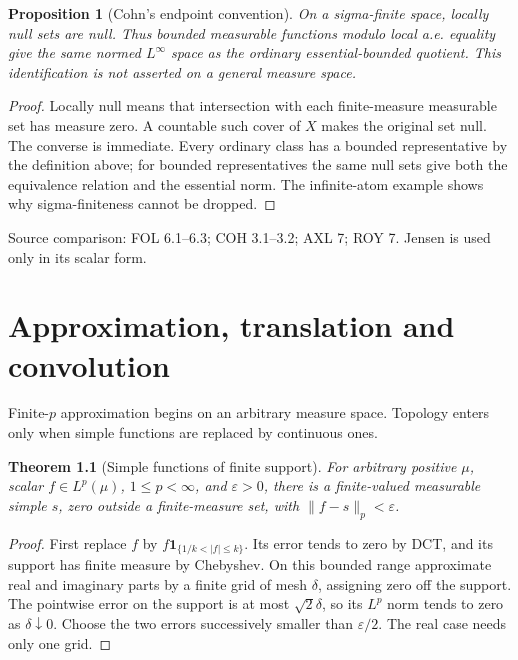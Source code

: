 \documentclass[11pt,oneside,openany]{book}
\newtheorem{theorem}{Theorem}[chapter]
\newtheorem{proposition}[theorem]{Proposition}
\theoremstyle{definition}
\theoremstyle{remark}
\newcommand{\eps}{\varepsilon}\newcommand{\ee}{\varepsilon}
\newcommand{\one}{\mathbf1}\newcommand{\ind}[1]{\mathbf1_{#1}}
\newcommand{\family}[1]{}
\newcommand{\source}[1]{\par\begingroup\small\sffamily\color{black!65}Source comparison: #1\par\endgroup}
\begin{document}
\begin{proposition}[Cohn's endpoint convention]\family{D11.10.cohn_endpoint_translation}\label{d11:10:cohn-endpoint-translation}
On a sigma-finite space, locally null sets are null. Thus bounded measurable
functions modulo local a.e. equality give the same normed $L^\infty$ space
as the ordinary essential-bounded quotient. This identification is not
asserted on a general measure space.
\end{proposition}
\begin{proof}
Locally null means that intersection with each finite-measure measurable
set has measure zero. A countable such cover of $X$ makes the original
set null. The converse is immediate. Every ordinary class has a bounded
representative by the definition above; for bounded representatives the
same null sets give both the equivalence relation and the essential norm.
The infinite-atom example shows why sigma-finiteness cannot be dropped.
\end{proof}
\source{FOL 6.1--6.3; COH 3.1--3.2; AXL 7; ROY 7. Jensen is used only in its scalar form.}



\chapter{Approximation, translation and convolution}\label{ch:d11-11}

Finite-$p$ approximation begins on an arbitrary measure space. Topology
enters only when simple functions are replaced by continuous ones.

\begin{theorem}[Simple functions of finite support]\family{D11.11.finite_p_simple_density}\label{d11:11:finite-p-simple-density}
For arbitrary positive $\mu$, scalar $f\in L^p(\mu)$, $1\leq p<\infty$,
and $\eps>0$, there is a finite-valued measurable simple $s$, zero outside
a finite-measure set, with $\|f-s\|_p<\eps$.
\end{theorem}
\begin{proof}
First replace $f$ by $f\one_{\{1/k<|f|\leq k\}}$. Its error tends to zero
by DCT, and its support has finite measure by Chebyshev. On this bounded
range approximate real and imaginary parts by a finite grid of mesh
$\delta$, assigning zero off the support. The pointwise error on the
support is at most $\sqrt2\delta$, so its $L^p$ norm tends to zero as
$\delta\downarrow0$. Choose the two errors successively smaller than
$\eps/2$. The real case needs only one grid.
\end{proof}
\end{document}
